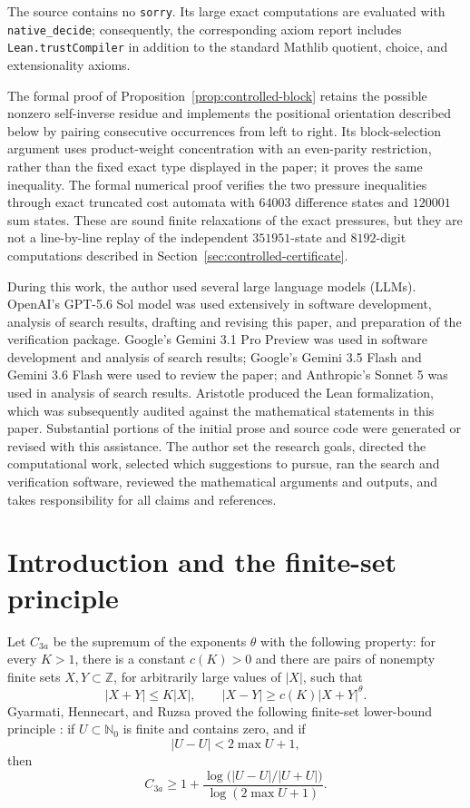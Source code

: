 \documentclass[11pt]{article}
\newcommand{\N}{\mathbb{N}_0}
\newcommand{\card}[1]{\lvert #1\rvert}
\begin{document}
The source contains no \texttt{sorry}.  Its large exact computations are
evaluated with \texttt{native\_decide}; consequently, the corresponding
axiom report includes \texttt{Lean.trustCompiler} in addition to the standard
Mathlib quotient, choice, and extensionality axioms.

The formal proof of Proposition~\ref{prop:controlled-block} retains the
possible nonzero self-inverse residue and implements the positional
orientation described below by pairing consecutive occurrences from left to
right.  Its block-selection argument uses product-weight concentration with
an even-parity restriction, rather than the fixed exact type displayed in
the paper; it proves the same inequality.  The formal numerical
proof verifies the two pressure inequalities through exact truncated cost
automata with $64003$ difference states and $120001$ sum states.  These are
sound finite relaxations of the exact pressures, but they are not a
line-by-line replay of the independent $351951$-state and $8192$-digit
computations described in Section~\ref{sec:controlled-certificate}.

During this work, the author used several large language models (LLMs).
OpenAI's GPT-5.6 Sol model was used extensively in software development,
analysis of search results, drafting and revising this paper, and preparation
of the verification package.  Google's Gemini 3.1 Pro Preview was used in
software development and analysis of search results; Google's Gemini 3.5
Flash and Gemini 3.6 Flash were used to review the paper; and Anthropic's
Sonnet 5 was used in analysis of search results.  Aristotle produced the
Lean formalization, which was subsequently audited against the mathematical
statements in this paper.  Substantial portions of the initial prose and
source code were generated or revised with this assistance.  The author set
the research goals, directed the computational work, selected which
suggestions to pursue, ran the search and verification software, reviewed the
mathematical arguments and outputs, and takes responsibility for all claims
and references.

\section{Introduction and the finite-set principle}
Let $C_{3a}$ be the supremum of the exponents $\theta$ with the following
property: for every $K>1$, there is a constant $c(K)>0$ and there are pairs
of nonempty finite sets $X,Y\subset\mathbb Z$, for arbitrarily large values of
$\card X$, such that
\[
 \card{X+Y}\le K\card X,
 \qquad
 \card{X-Y}\ge c(K)\card{X+Y}^{\theta}.
\]
Gyarmati, Hennecart, and Ruzsa proved the following
finite-set lower-bound principle \cite[Lemma in Section~2]{GHR2007}: if $U\subset\N$ is finite
and contains zero, and if
\[
 \card{U-U}<2\max U+1,
\]
then
\begin{equation}\label{eq:GHR}
 C_{3a}\ge
 1+\frac{\log\bigl(\card{U-U}/\card{U+U}\bigr)}
          {\log(2\max U+1)}.
\end{equation}
\end{document}
